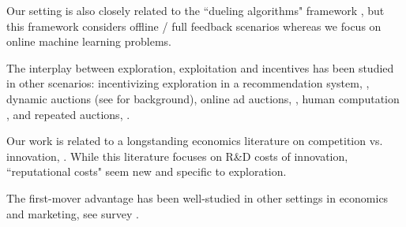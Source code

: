 \documentclass[../competing_bandits_with_appendix.tex]{subfiles}
\begin{document}
Our setting is also closely related to the ``dueling algorithms" framework \cite{DuelingAlgs-stoc11}, but this framework considers offline / full feedback scenarios whereas we focus on online machine learning problems.



The interplay between exploration, exploitation and incentives has been studied in other scenarios: incentivizing exploration in a recommendation system,
    \eg \cite{Kremer-JPE14,Frazier-ec14,Che-13,ICexploration-ec15,Bimpikis-exploration-ms17},
dynamic auctions
    (see \cite{DynAuctions-survey10} for background),
online ad auctions, \eg
    \cite{MechMAB-ec09,DevanurK09,NSV08,Transform-ec10-jacm},
human computation
    \cite{RepeatedPA-ec14,Ghosh-itcs13,Krause-www13},
and repeated auctions, \eg
    \cite{Amin-auctions-nips13,Amin-auctions-nips14,Jieming-ec18}.


Our work is related to a longstanding economics literature on competition vs. innovation, \eg \cite{Schumpeter-42,barro2004economic,Aghion-QJE05}. While this literature focuses on R\&D costs of innovation, ``reputational costs" seem new and specific to exploration.



The first-mover advantage has been well-studied in other settings in economics and marketing, see survey \cite{kerin1992first}.
\end{document}
